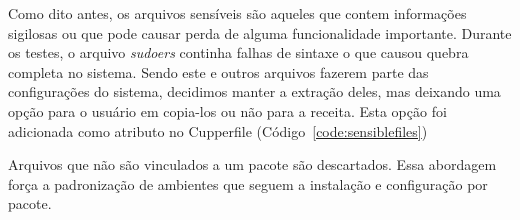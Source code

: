Como dito antes, os arquivos sensíveis são aqueles que contem
informações sigilosas ou que pode causar perda de alguma funcionalidade importante.
Durante os testes, o arquivo \textit{sudoers} continha falhas de sintaxe o que causou
quebra completa no sistema. Sendo este e outros arquivos fazerem parte das
configurações do sistema, decidimos manter a extração deles, mas deixando uma opção
para o usuário em copia-los ou não para a receita. Esta opção foi adicionada como
atributo no Cupperfile (Código~\ref{code:sensiblefiles})

\noindent\begin{minipage}{\textwidth}
  \lstset{style=shell}
  
\end{minipage}\hfill

Arquivos que não são vinculados a um pacote são descartados. Essa abordagem força
a padronização de ambientes que seguem a instalação e configuração por pacote.


